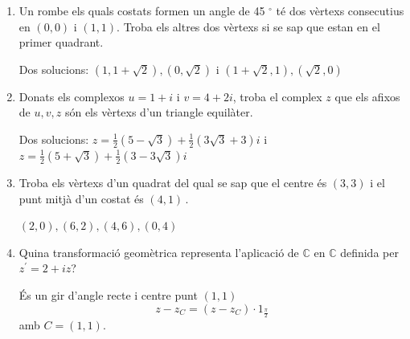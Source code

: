 \begin{enumerate}
\begin{indicacio}
$(-\sqrt{3},-1)$ i $(\sqrt{3},-1)$
\end{indicacio}

\item Un rombe els quals costats formen un angle de 45
$^{\circ}$
té dos vèrtexs consecutius en $(0,0)$ i $(1,1)$. Troba els altres
dos vèrtexs si se sap que estan en el primer quadrant.

\begin{indicacio}
Dos solucions: $(1,1+\sqrt{2}),(0,\sqrt{2})$ i $(1+\sqrt{2}
,1),(\sqrt{2},0)$
\end{indicacio}

\item Donats els complexos $u=1+i$ i $v=4+2i$, troba el complex $z$ que
els afixos de $u,v,z$ són els vèrtexs d’un triangle equilàter.

\begin{indicacio}
Dos solucions: $z=\frac{1}{2}(5-\sqrt{3})+\frac{1}{2}(3\sqrt{3
}+3)i$ i $z=\frac{1}{2}(5+\sqrt{3})+\frac{1}{2}(3-3\sqrt{3})i$
\end{indicacio}

\item Troba els vèrtexs d’un quadrat del qual se sap que el centre és
$(3,3)$ i el punt mitjà d’un costat és $(4,1)\,$.

\begin{indicacio}
$(2,0),(6,2),(4,6),(0,4)$
\end{indicacio}

\item Quina transformació geomètrica representa
l’aplicació de $\mathbb{C}$ en $\mathbb{C}$ definida per $z^{\prime
}=2+iz$?

\begin{indicacio}
És un gir d’angle recte i centre punt $(1,1)$
\[
z-z_{C}=(z-z_{C})\cdot 1_{\frac{\pi }{2}}
\]
amb $C=(1,1)$.
\end{indicacio}

\end{enumerate}

